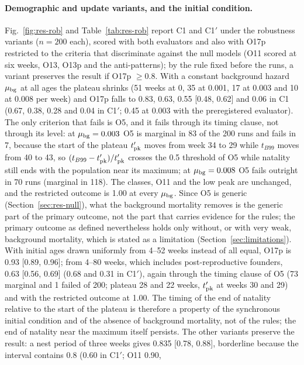 \paragraph{Demographic and update variants, and the initial condition.}
Fig.~\ref{fig:res-rob} and Table~\ref{tab:res-rob} report \textsf{C1} and \textsf{C1}$'$ under the robustness variants
($n=200$ each), scored with both evaluators and also with O17p restricted to the criteria
that discriminate against the null models (O11 scored at six weeks, O13, O13p and the anti-patterns); by the rule fixed before the runs, a
variant preserves the result if O17p $\ge0.8$. With a constant background hazard $\mu_{\rm bg}$ at all ages the
plateau shrinks (51 weeks at 0, 35 at 0.001, 17 at 0.003 and 10 at 0.008 per week) and O17p falls to 0.83, 0.63,
0.55 [0.48, 0.62] and 0.06 in \textsf{C1} (0.67, 0.38, 0.28 and 0.04 in \textsf{C1}$'$; 0.45 at 0.003 with the
preregistered evaluator). The only criterion that fails is O5, and it fails through its timing clause, not through its
level: at $\mu_{\rm bg}=0.003$ O5 is marginal in 83 of the 200 runs and fails in 7, because the start of the plateau
$t'_{\rm pk}$ moves from week 34 to 29 while $t_{B99}$ moves from 40 to 43, so $(t_{B99}-t'_{\rm pk})/t'_{\rm pk}$
crosses the 0.5 threshold of O5 while natality still ends with the population near its maximum; at
$\mu_{\rm bg}=0.008$ O5 fails outright in 70 runs (marginal in 118). The classes, O11 and the low peak are
unchanged, and the restricted outcome is 1.00 at every $\mu_{\rm bg}$. Since O5 is generic (Section~\ref{sec:res-null}),
what the background mortality removes is the generic part of the primary outcome, not the part that carries
evidence for the rules; the primary outcome as defined nevertheless holds only without, or with very weak,
background mortality, which is stated as a limitation (Section~\ref{sec:limitations}). With initial ages drawn
uniformly from 4--52 weeks instead of all equal, O17p is 0.93 [0.89, 0.96]; from 4--80 weeks, which includes
post-reproductive founders, 0.63 [0.56, 0.69] (0.68 and 0.31 in \textsf{C1}$'$), again through the timing clause of
O5 (73 marginal and 1 failed of 200; plateau 28 and 22 weeks, $t'_{\rm pk}$ at weeks 30 and 29) and with the
restricted outcome at 1.00. The timing of the end of natality relative to the start of the plateau is therefore a
property of the synchronous initial condition and of the absence of background mortality, not of the rules; the end
of natality near the maximum itself persists. The other variants preserve the result: a nest period of three weeks
gives 0.835 [0.78, 0.88], borderline because the interval contains 0.8 (0.60 in \textsf{C1}$'$; O11 0.90,
